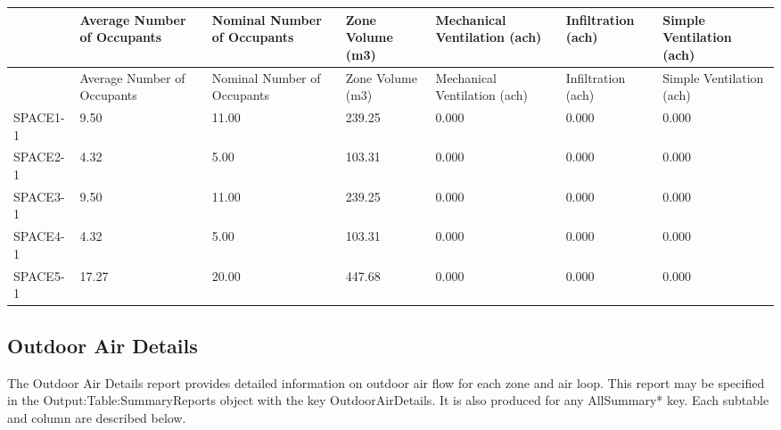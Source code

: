 \begin{longtable}[c]{>{\raggedright}p{0.85in}>{\raggedright}p{0.85in}>{\raggedright}p{0.85in}>{\raggedright}p{0.85in}>{\raggedright}p{0.85in}>{\raggedright}p{0.85in}>{\raggedright}p{0.85in}}
\toprule 
~ & Average Number of Occupants & Nominal Number of Occupants & Zone Volume (m3) & Mechanical Ventilation (ach) & Infiltration (ach) & Simple Ventilation (ach) \tabularnewline
\midrule
\endfirsthead

\toprule 
~ & Average Number of Occupants & Nominal Number of Occupants & Zone Volume (m3) & Mechanical Ventilation (ach) & Infiltration (ach) & Simple Ventilation (ach) \tabularnewline
\midrule
\endhead

SPACE1-1 & 9.50 & 11.00 & 239.25 & 0.000 & 0.000 & 0.000 \tabularnewline
SPACE2-1 & 4.32 & 5.00 & 103.31 & 0.000 & 0.000 & 0.000 \tabularnewline
SPACE3-1 & 9.50 & 11.00 & 239.25 & 0.000 & 0.000 & 0.000 \tabularnewline
SPACE4-1 & 4.32 & 5.00 & 103.31 & 0.000 & 0.000 & 0.000 \tabularnewline
SPACE5-1 & 17.27 & 20.00 & 447.68 & 0.000 & 0.000 & 0.000 \tabularnewline
\bottomrule
\end{longtable}

\subsection{Outdoor Air Details}\label{outdoor-air-details}

The Outdoor Air Details report provides detailed information on outdoor air flow for each zone and air loop. This report may be specified in the  Output:Table:SummaryReports object with the key OutdoorAirDetails. It is also produced for any AllSummary* key. Each subtable and column are described below.

